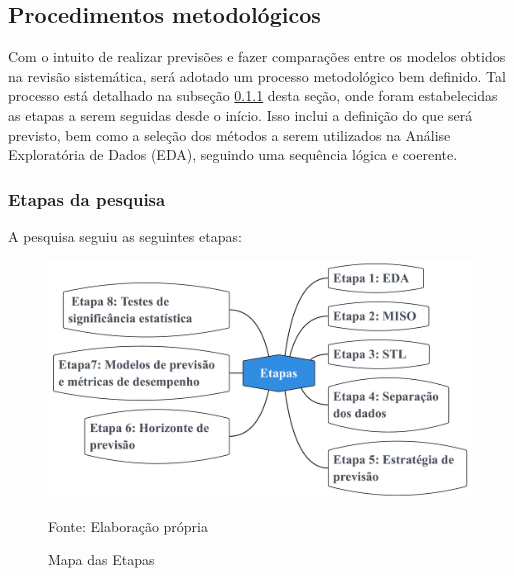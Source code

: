 \subsection{Procedimentos metodol{\'o}gicos} \label{subsec:metod}

Com o intuito de realizar previsões e fazer comparações entre os modelos obtidos na revisão sistemática, será adotado um processo metodológico bem definido. Tal processo está detalhado na subseção \ref{subsubsec:etp} desta seção, onde foram estabelecidas as etapas a serem seguidas desde o início. Isso inclui a definição do que será previsto, bem como a seleção dos métodos a serem utilizados na Análise Exploratória de Dados (EDA), seguindo uma sequência lógica e coerente.
   
    \subsubsection{Etapas da pesquisa}\label{subsubsec:etp}
    A pesquisa seguiu as seguintes etapas:
    \begin{figure}[H]
    	\centering
    	\caption{Mapa das Etapas}
    	\label{fig:etapas}
    	\includegraphics[width=0.9\linewidth]{Introducao/Figuras/Etapas}
    	
    	Fonte: Elaboração própria
    \end{figure}
